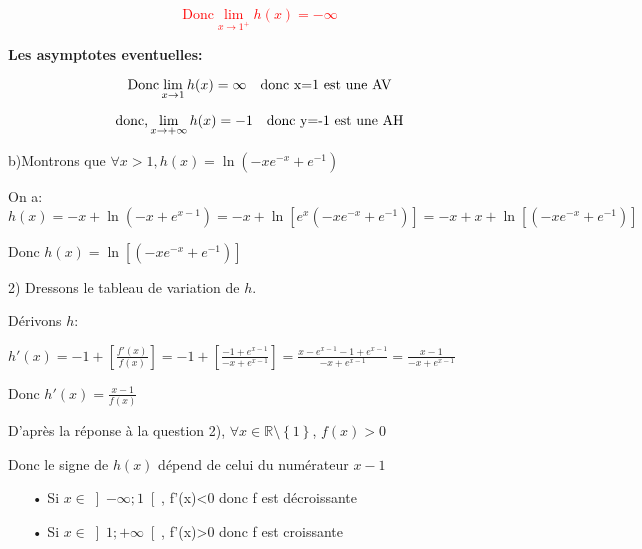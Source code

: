 \documentclass[12pt]{article}
\begin{document}
\textcolor{red}{\[\text{Donc}\lim_{x \to 1^{+}}h(x)=-\infty\]}

\textbf{Les  asymptotes eventuelles:}

\textcolor{red}{\[\text{Donc}\lim_{x \to 1 }h(x)=\infty\text{\quad donc x=1 est une AV}\]}

\textcolor{red}{\[\text{donc,}\lim_{x \to +\infty}h(x)=-1\text{\quad donc y=-1 est une AH}\]}

b)Montrons que $\forall x>1, h(x)=\ln(-xe^{-x}+e^{-1}) $ 

On a: $h(x)=-x+\ln(-x+e^{x-1})=-x+\ln\left[e^{x}(-xe^{-x}+e^{-1})\right]=-x+x+\ln\left[(-xe^{-x}+e^{-1})\right]$

Donc $h(x)=\ln\left[(-xe^{-x}+e^{-1})\right]$




2) Dressons le tableau de variation de  $h$. 

Dérivons $h$:

$h'(x)=-1+\left[\frac{f'(x)}{f(x)}\right]=-1+\left[\frac{-1+e^{x-1}}{-x+e^{x-1}}\right]=\frac{x-e^{x-1}-1+e^{x-1}}{-x+e^{x-1}}=\frac{x-1}{-x+e^{x-1}}$

Donc $h'(x)=\frac{x-1}{f(x)}$

D'après la réponse à la question 2), $\forall x\in \mathbb{R}\setminus\left\lbrace 1\right\rbrace $, $f(x)>0$

Donc le signe de $h(x)$ dépend de celui du numérateur $x-1$
\begin{itemize}
\item[•] Si $x\in \left]-\infty; 1\right[$, f'(x)<0 donc f est décroissante
\item[•] Si $x\in \left]1; +\infty\right[$, f'(x)>0 donc f est croissante
\end{itemize}
\end{document}
